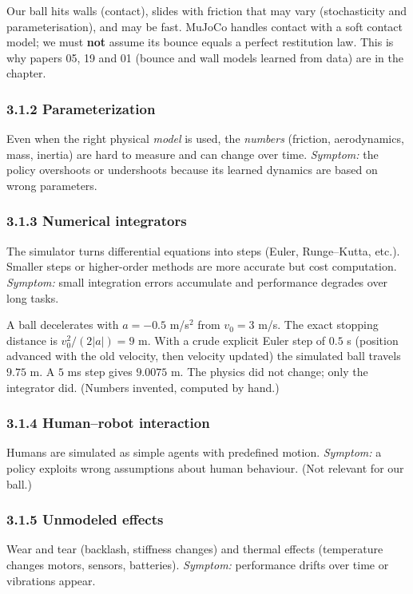 \documentclass[11pt,a4paper]{article}
\begin{document}
\begin{ours}
Our ball hits walls (contact), slides with friction that may vary (stochasticity and
parameterisation), and may be fast. MuJoCo handles contact with a soft contact model; we must
\textbf{not} assume its bounce equals a perfect restitution law. This is why papers 05, 19 and 01
(bounce and wall models learned from data) are in the chapter.
\end{ours}

\subsubsection*{3.1.2 Parameterization}
Even when the right physical \emph{model} is used, the \emph{numbers} (friction, aerodynamics,
mass, inertia) are hard to measure and can change over time. \emph{Symptom:} the policy overshoots
or undershoots because its learned dynamics are based on wrong parameters.

\subsubsection*{3.1.3 Numerical integrators}
The simulator turns differential equations into steps (Euler, Runge--Kutta, etc.). Smaller steps
or higher-order methods are more accurate but cost computation. \emph{Symptom:} small integration
errors accumulate and performance degrades over long tasks.

\begin{toy}
A ball decelerates with $a=-0.5$ m/s$^2$ from $v_0=3$ m/s. The exact stopping distance is
$v_0^2/(2|a|)=9$ m. With a crude explicit Euler step of $0.5$ s (position advanced with the old velocity, then
velocity updated) the simulated ball travels $9.75$ m. A $5$ ms step gives $9.0075$ m. The
physics did not change; only the integrator did. (Numbers invented, computed by hand.)
\end{toy}

\subsubsection*{3.1.4 Human--robot interaction}
Humans are simulated as simple agents with predefined motion. \emph{Symptom:} a policy exploits
wrong assumptions about human behaviour. (Not relevant for our ball.)

\subsubsection*{3.1.5 Unmodeled effects}
Wear and tear (backlash, stiffness changes) and thermal effects (temperature changes motors,
sensors, batteries). \emph{Symptom:} performance drifts over time or vibrations appear.
\end{document}
